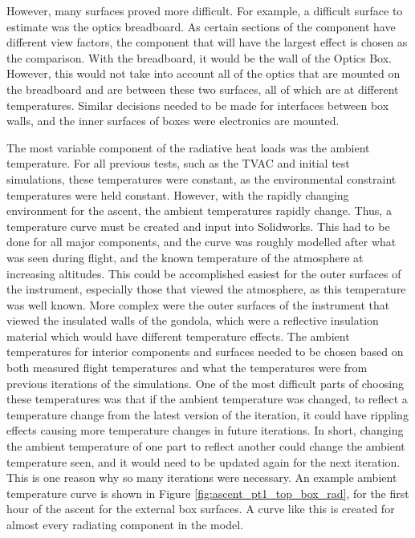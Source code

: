 However, many surfaces proved more difficult. For example, a difficult surface to estimate was the optics breadboard. As certain sections of the component have different view factors, the component that will have the largest effect is chosen as the comparison. With the breadboard, it would be the wall of the Optics Box. However, this would not take into account all of the optics that are mounted on the breadboard and are between these two surfaces, all of which are at different temperatures. Similar decisions needed to be made for interfaces between box walls, and the inner surfaces of boxes were electronics are mounted.

The most variable component of the radiative heat loads was the ambient temperature. For all previous tests, such as the TVAC and initial test simulations, these temperatures were constant, as the environmental constraint temperatures were held constant. However, with the rapidly changing environment for the ascent, the ambient temperatures rapidly change. Thus, a temperature curve must be created and input into Solidworks. This had to be done for all major components, and the curve was roughly modelled after what was seen during flight, and the known temperature of the atmosphere at increasing altitudes. This could be accomplished easiest for the outer surfaces of the instrument, especially those that viewed the atmosphere, as this temperature was well known. More complex were the outer surfaces of the instrument that viewed the insulated walls of the gondola, which were a reflective insulation material which would have different temperature effects. The ambient temperatures for interior components and surfaces needed to be chosen based on both measured flight temperatures and what the temperatures were from previous iterations of the simulations. One of the most difficult parts of choosing these temperatures was that if the ambient temperature was changed, to reflect a temperature change from the latest version of the iteration, it could have rippling effects causing more temperature changes in future iterations. In short, changing the ambient temperature of one part to reflect another could change the ambient temperature seen, and it would need to be updated again for the next iteration. This is one reason why so many iterations were necessary. An example ambient temperature curve is shown in Figure \ref{fig:ascent_pt1_top_box_rad}, for the first hour of the ascent for the external box surfaces. A curve like this is created for almost every radiating component in the model.

